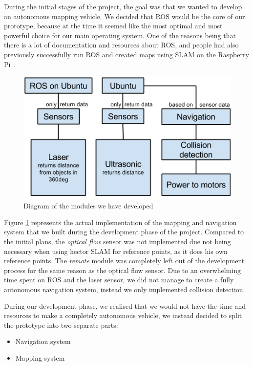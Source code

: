 During the initial stages of the project, the goal was that we wanted to develop an autonomous mapping vehicle. We decided that ROS would be the core of our prototype, because at the time it seemed like the most optimal and most powerful choice for our main operating system. One of the reasons being that there is a lot of documentation and resources about ROS, and people had also previously successfully run ROS and created maps using SLAM on the Raspberry Pi~\cite{pibot}\cite{pibotbook}.

\begin{figure}[H]
	\centering
	\includegraphics[scale=.7]{images/developmentdiagram2.png}
	\caption{Diagram of the modules we have developed}
	\label{fig:developmentdiagram2}
\end{figure}

Figure \ref{fig:developmentdiagram2} represents the actual implementation of the mapping and navigation system that we built during the development phase of the project. Compared to the initial plans, the \textit{optical flow} sensor was not implemented due not being necessary when using hector SLAM for reference points, as it does his own reference points. The \textit{remote} module was completely left out of the development process for the same reason as the optical flow sensor. Due to an overwhelming time spent on ROS and the laser sensor, we did not manage to create a fully autonomous navigation system, instead we only implemented collision detection.

During our development phase, we realised that we would not have the time and resources to make a completely autonomous vehicle, we instead decided to split the prototype into two separate parts: 
\begin{itemize}
	\item Navigation system
	\item Mapping system
\end{itemize}

